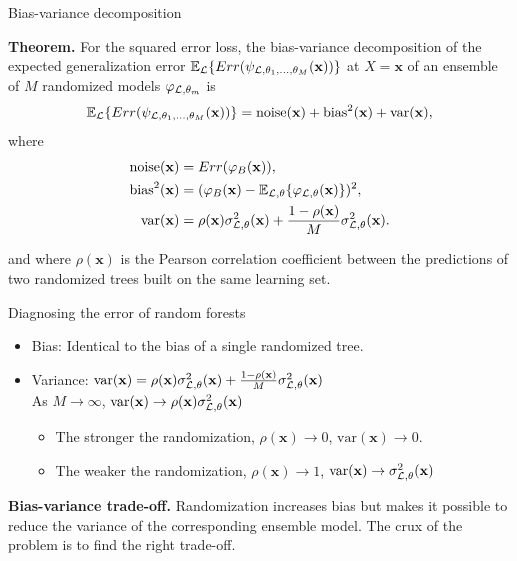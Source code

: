 \documentclass{beamer}
\begin{document}
\begin{frame}{Bias-variance decomposition}

{\bf Theorem.}
For the squared error loss, the bias-variance decomposition of the expected
generalization error $\mathbb{E}_{\cal L} \{ Err( \psi_{{\cal L},\theta_1,\dots,\theta_M}(\mathbf{x}))
\}$ at $X=\mathbf{x}$ of an ensemble of $M$ randomized models $\varphi_{{\cal L},\theta_m}$ is
\begin{equation*}
\mathbb{E}_{\cal L} \{ Err(\psi_{{\cal L},\theta_1,\dots,\theta_M}(\mathbf{x})) \} = \text{noise}(\mathbf{x}) + \text{bias}^2(\mathbf{x}) + \text{var}(\mathbf{x}),
\end{equation*}
where
\begin{align*}
\text{noise}(\mathbf{x}) &= Err(\varphi_B(\mathbf{x})), \\
\text{bias}^2(\mathbf{x}) &= (\varphi_B(\mathbf{x}) - \mathbb{E}_{{\cal L},\theta} \{ \varphi_{{\cal L},\theta}(\mathbf{x}) \} )^2, \\
\text{var}(\mathbf{x}) &= \rho(\mathbf{x}) \sigma^2_{{\cal L},\theta}(\mathbf{x}) + \frac{1 - \rho(\mathbf{x})}{M} \sigma^2_{{\cal L},\theta}(\mathbf{x}).
\end{align*}

and where $\rho(\mathbf{x})$ is the Pearson correlation coefficient between
the predictions of two randomized trees built on the same learning set.

\end{frame}


\begin{frame}{Diagnosing the error of random forests \citep{louppe2014understanding}}

\begin{itemize}
\item Bias: {\color{blue} Identical} to the bias of a single randomized tree.
\item Variance: $\text{var}(\mathbf{x}) = \rho(\mathbf{x}) \sigma^2_{{\cal L},\theta}(\mathbf{x}) + \frac{1 - \rho(\mathbf{x})}{M} \sigma^2_{{\cal L},\theta}(\mathbf{x})$\\
As $M \to \infty$, {\color{red} $\text{var}(\mathbf{x}) \to \rho(\mathbf{x}) \sigma^2_{{\cal L},\theta}(\mathbf{x})$}
  \begin{itemize}
    \item The stronger the randomization, $\rho(\mathbf{x}) \to 0$, $\text{var}(\mathbf{x}) \to 0$.
    \item The weaker the randomization, $\rho(\mathbf{x}) \to 1$, $\text{var}(\mathbf{x}) \to \sigma^2_{{\cal L},\theta}(\mathbf{x})$
  \end{itemize}
\end{itemize}

\vspace{1cm}

{\bf Bias-variance trade-off.} Randomization increases bias but makes it
possible to reduce the variance of the corresponding ensemble model. The crux
of the problem is to {\color{red} find the right trade-off}.

\end{frame}
\end{document}
